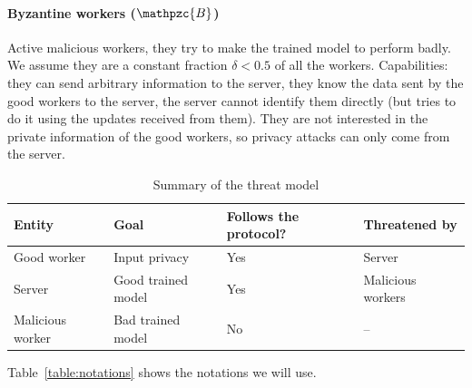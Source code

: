 \documentclass{article}
\newcommand{\gset}{\ensuremath{{\mathpzc{G}}}}
\newcommand{\bset}{\ensuremath{{\mathpzc{B}}}}
\begin{document}
\paragraph*{Byzantine workers ($\bset$)} Active malicious workers, they try to make the trained model to perform badly. We assume they are a constant fraction $\delta < 0.5$ of all the workers.
Capabilities: they can send arbitrary information to the server, they know the data sent by the good workers to the server, the server cannot identify them directly (but tries to do it using the updates received from them). They are not interested in the private information of the good workers, so privacy attacks can only come from the server.


\begin{table}
\caption{Summary of the threat model}\label{table:threat-model}
\centering
\begin{tabular}{llll}
\toprule
Entity & Goal & Follows the protocol? & Threatened by \\
\midrule
Good worker & Input privacy & Yes & Server \\
Server & Good trained model & Yes & Malicious workers \\
Malicious worker & Bad trained model & No & -- \\
\bottomrule
\end{tabular}
\end{table}

Table~\ref{table:notations} shows the notations we will use.



\end{document}
